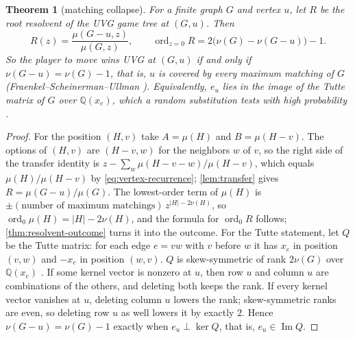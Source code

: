 \documentclass[11pt]{amsart}
\theoremstyle{plain}
\newtheorem{theorem}{Theorem}[section]
\theoremstyle{definition}
\theoremstyle{remark}
\numberwithin{equation}{section}
\newcommand{\QQ}{\mathbb{Q}}
\newcommand{\ord}{\operatorname{ord}}
\begin{document}
\begin{theorem}[matching collapse]\label{thm:matching-collapse}
For a finite graph $G$ and vertex $u$, let $R$ be the root resolvent of the UVG game tree at $(G,u)$. Then
\[
R(z)=\frac{\mu(G-u,z)}{\mu(G,z)},\qquad \ord_{z=0}R=2\bigl(\nu(G)-\nu(G-u)\bigr)-1.
\]
So the player to move wins UVG at $(G,u)$ if and only if $\nu(G-u)=\nu(G)-1$, that is, $u$ is covered by every maximum matching of $G$ \textup{(}Fraenkel--Scheinerman--Ullman \cite{FSU}\textup{)}. Equivalently, $e_u$ lies in the image of the Tutte matrix of $G$ over $\QQ(x_e)$, which a random substitution tests with high probability \cite{Lovasz}.
\end{theorem}

\begin{proof}
For the position $(H,v)$ take $A=\mu(H)$ and $B=\mu(H-v)$. The options of $(H,v)$ are $(H-v,w)$ for the neighbors $w$ of $v$, so the right side of the transfer identity is $z-\sum_w\mu(H-v-w)/\mu(H-v)$, which equals $\mu(H)/\mu(H-v)$ by \eqref{eq:vertex-recurrence}; \cref{lem:transfer} gives $R=\mu(G-u)/\mu(G)$. The lowest-order term of $\mu(H)$ is $\pm(\text{number of maximum matchings})\,z^{|H|-2\nu(H)}$, so $\ord_0\mu(H)=|H|-2\nu(H)$, and the formula for $\ord_0R$ follows; \cref{thm:resolvent-outcome} turns it into the outcome.
For the Tutte statement, let $Q$ be the Tutte matrix: for each edge $e=vw$ with $v$ before $w$ it has $x_e$ in position $(v,w)$ and $-x_e$ in position $(w,v)$. $Q$ is skew-symmetric of rank $2\nu(G)$ over $\QQ(x_e)$ \cite{Tutte,Lovasz}. If some kernel vector is nonzero at $u$, then row $u$ and column $u$ are combinations of the others, and deleting both keeps the rank. If every kernel vector vanishes at $u$, deleting column $u$ lowers the rank; skew-symmetric ranks are even, so deleting row $u$ as well lowers it by exactly $2$. Hence $\nu(G-u)=\nu(G)-1$ exactly when $e_u\perp\ker Q$, that is, $e_u\in\operatorname{Im}Q$.
\end{proof}
\end{document}
